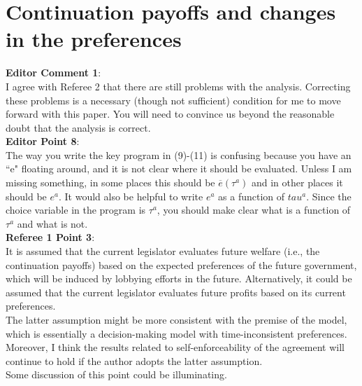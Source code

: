 \documentclass[12pt]{article}
\newcommand{\ov}{\overline}
\begin{document}
\newpage
\section{Continuation payoffs and changes in the preferences}
\textbf{Editor Comment 1}: \\
I agree with Referee 2 that there are still problems with the analysis. Correcting these problems is a necessary (though not sufficient) condition for me to move forward with this paper. You will need to convince us beyond the reasonable doubt that the analysis is correct. \\

\textbf{Editor Point 8}:\\
The way you write the key program in (9)-(11) is confusing because you have an ``e" floating around, and it is not clear where it should be evaluated. Unless I am missing something, in some places this should be $\ov{e}(\tau^a)$ and in other places it should be $e^a$. It would also be helpful to write $e^a$ as a function of $tau^a$. Since the choice variable in the program is $\tau^a$, you should make clear what is a function of $\tau^a$ and what is not. \\

\textbf{Referee 1 Point 3}: \\
It is assumed that the current legislator evaluates future welfare (i.e., the continuation payoffs) based on the expected preferences of the future government, which will be induced by lobbying efforts in the future. Alternatively, it could be assumed that the current legislator evaluates future profits based on its current preferences. \\

The latter assumption might be more consistent with the premise of the model, which is essentially a decision-making model with time-inconsistent preferences. Moreover, I think the results related to self-enforceability of the agreement will continue to hold if the author adopts the latter assumption. \\

Some discussion of this point could be illuminating. \\
\end{document}
